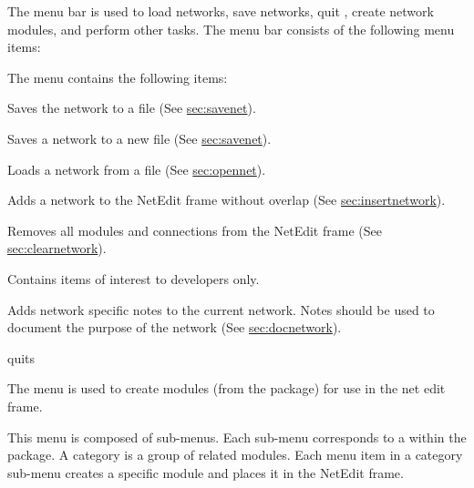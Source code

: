 \begin{description}
   The menu bar is used to load networks, save
  networks, quit \sr{}, create network modules, and perform other
  tasks.  The menu bar consists of the following menu items:

  \begin{description}
     The  menu contains the following items:

    \begin{description}
       Saves the network to a file (See \hyperref{this
        section}{Section~}{}{sec:savenet}).

       Saves a network to a new file (See
      \hyperref{this section}{Section~}{}{sec:savenet}).
      
       Loads a network from a file (See
      \hyperref{this section}{Section~}{}{sec:opennet}).
      
       Adds a network to the NetEdit frame
      without overlap (See \hyperref{this
        section}{Section~}{}{sec:insertnetwork}).
      
       Removes all modules and connections from
      the NetEdit frame (See \hyperref{this
        section}{Section~}{}{sec:clearnetwork}).
      
       Contains items of interest to
      developers only.
      
       Adds network specific
      notes to the current network.  Notes should be used to document
      the purpose of the network (See \hyperref{this
        section}{Section~}{}{sec:docnetwork}).
    
       quits \sr{}
    \end{description}
  \end{description}
  
  \begin{description}
     The  menu is used to create modules
    (from the \sr{} package) for use in the net edit frame.

    This menu is composed of sub-menus. Each sub-menu corresponds to
     a 
     within the \sr{} package.  A category is a group of
    related modules.  Each menu item in a category sub-menu creates a
    specific module and places it in the NetEdit frame.  
    

\end{description}
\end{description}
